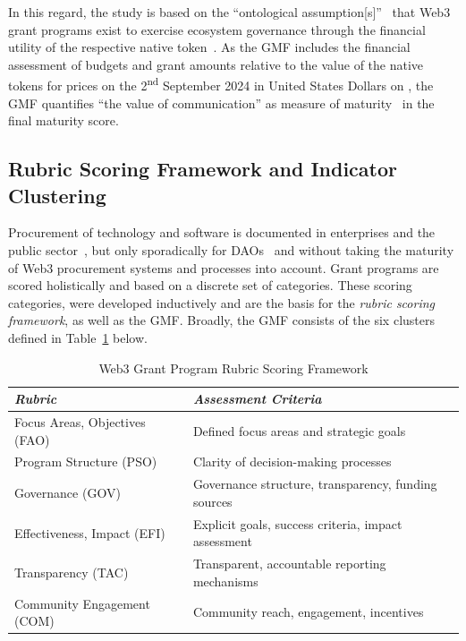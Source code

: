 \documentclass[conference]{IEEEtran}
\begin{document}
In this regard, the study is based on the ``ontological assumption[s]''~\cite[pp.~94]{mukumbang_retroductive_2023} that Web3 grant programs exist to exercise ecosystem governance through the financial utility of the respective native token~\cite{beck_governance_2018,messias_understanding_2024}. As the GMF includes the financial assessment of budgets and grant amounts relative to the value of the native tokens for prices on the 2\textsuperscript{nd} September 2024 in United States Dollars on \cite{coinnarketcap_cryptocurrency_2024}, the GMF quantifies ``the value of communication'' as measure of maturity~\cite{johansson_roadmap_2019} in the final maturity score.

\subsection{Rubric Scoring Framework and Indicator Clustering}\label{sec_3.1}

Procurement of technology and software is documented in enterprises and the public sector~\cite{bartle_review_2003,johansson_roadmap_2019,uyarra_barriers_2014}, but only sporadically for DAOs~\cite{monteiro_decentralised_2023} and without taking the maturity of Web3 procurement systems and processes into account. Grant programs are scored holistically and based on a discrete set of categories. These scoring categories, were developed inductively and are the basis for the \textit{rubric scoring framework}, as well as the GMF. Broadly, the GMF consists of the six clusters defined in Table~\ref{tab:grant_rubric} below.

\begin{table}[htbp]
\caption{Web3 Grant Program Rubric Scoring Framework}
\centering
\footnotesize
\begin{tabular}{p{3.8cm}p{4.5cm}}
\hline
\textbf{\textit{Rubric}} & \textbf{\textit{Assessment Criteria}} \\
\hline
Focus Areas, Objectives (FAO) & Defined focus areas and strategic goals \\
\hline
Program Structure (PSO) & Clarity of decision-making processes \\
\hline
Governance (GOV) & Governance structure, transparency, funding sources \\
\hline
Effectiveness, Impact (EFI) & Explicit goals, success criteria, impact assessment \\
\hline
Transparency (TAC) & Transparent, accountable reporting mechanisms \\
\hline
Community Engagement (COM) & Community reach, engagement, incentives \\
\hline
\end{tabular}
\label{tab:grant_rubric}
\end{table}
\end{document}
